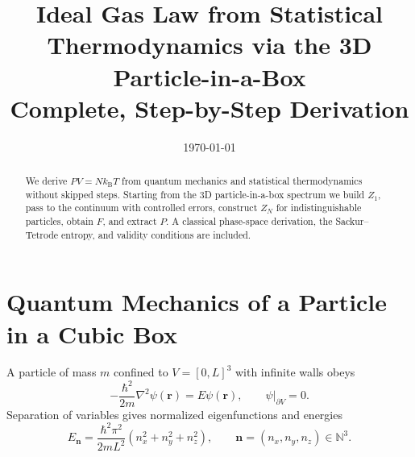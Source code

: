\documentclass[12pt]{article}
\title{Ideal Gas Law from Statistical Thermodynamics via the 3D Particle-in-a-Box\\\large Complete, Step-by-Step Derivation}
\author{}
\date{\today}
\numberwithin{equation}{section}
\newcommand{\kB}{k_{\mathrm B}}
\begin{document}
\maketitle
\begin{abstract}
We derive $PV=N\kB T$ from quantum mechanics and statistical thermodynamics without skipped steps. Starting from the 3D particle-in-a-box spectrum we build $Z_1$, pass to the continuum with controlled errors, construct $Z_N$ for indistinguishable particles, obtain $F$, and extract $P$. A classical phase-space derivation, the Sackur--Tetrode entropy, and validity conditions are included.
\end{abstract}

\section{Quantum Mechanics of a Particle in a Cubic Box}
A particle of mass $m$ confined to $V=[0,L]^3$ with infinite walls obeys
\begin{equation}
-\frac{\hbar^2}{2m}\nabla^2\psi(\bm r)=E\psi(\bm r),\qquad \psi\big|_{\partial V}=0.
\label{eq:TISE}
\end{equation}
Separation of variables gives normalized eigenfunctions and energies
\begin{equation}
E_{\bm n}=\frac{\hbar^2\pi^2}{2mL^2}\left(n_x^2+n_y^2+n_z^2\right),\qquad \bm n=(n_x,n_y,n_z)\in\mathbb N^3.
\label{eq:boxE}
\end{equation}
\end{document}
